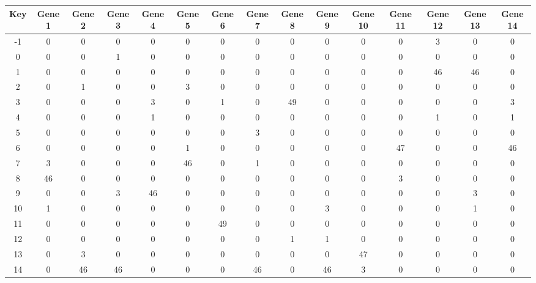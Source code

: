 \begin{tabular}{|c|c|c|c|c|c|c|c|c|c|c|c|c|c|c|}
\hline
Key & Gene 1 & Gene 2 & Gene 3 & Gene 4 & Gene 5 & Gene 6 & Gene 7 & Gene 8 & Gene 9 & Gene 10 & Gene 11 & Gene 12 & Gene 13 & Gene 14 \\
\hline
-1 & 0 & 0 & 0 & 0 & 0 & 0 & 0 & 0 & 0 & 0 & 0 & 3 & 0 & 0 \\
0 & 0 & 0 & 1 & 0 & 0 & 0 & 0 & 0 & 0 & 0 & 0 & 0 & 0 & 0 \\
1 & 0 & 0 & 0 & 0 & 0 & 0 & 0 & 0 & 0 & 0 & 0 & 46 & 46 & 0 \\
2 & 0 & 1 & 0 & 0 & 3 & 0 & 0 & 0 & 0 & 0 & 0 & 0 & 0 & 0 \\
3 & 0 & 0 & 0 & 3 & 0 & 1 & 0 & 49 & 0 & 0 & 0 & 0 & 0 & 3 \\
4 & 0 & 0 & 0 & 1 & 0 & 0 & 0 & 0 & 0 & 0 & 0 & 1 & 0 & 1 \\
5 & 0 & 0 & 0 & 0 & 0 & 0 & 3 & 0 & 0 & 0 & 0 & 0 & 0 & 0 \\
6 & 0 & 0 & 0 & 0 & 1 & 0 & 0 & 0 & 0 & 0 & 47 & 0 & 0 & 46 \\
7 & 3 & 0 & 0 & 0 & 46 & 0 & 1 & 0 & 0 & 0 & 0 & 0 & 0 & 0 \\
8 & 46 & 0 & 0 & 0 & 0 & 0 & 0 & 0 & 0 & 0 & 3 & 0 & 0 & 0 \\
9 & 0 & 0 & 3 & 46 & 0 & 0 & 0 & 0 & 0 & 0 & 0 & 0 & 3 & 0 \\
10 & 1 & 0 & 0 & 0 & 0 & 0 & 0 & 0 & 3 & 0 & 0 & 0 & 1 & 0 \\
11 & 0 & 0 & 0 & 0 & 0 & 49 & 0 & 0 & 0 & 0 & 0 & 0 & 0 & 0 \\
12 & 0 & 0 & 0 & 0 & 0 & 0 & 0 & 1 & 1 & 0 & 0 & 0 & 0 & 0 \\
13 & 0 & 3 & 0 & 0 & 0 & 0 & 0 & 0 & 0 & 47 & 0 & 0 & 0 & 0 \\
14 & 0 & 46 & 46 & 0 & 0 & 0 & 46 & 0 & 46 & 3 & 0 & 0 & 0 & 0 \\
\hline
\end{tabular}